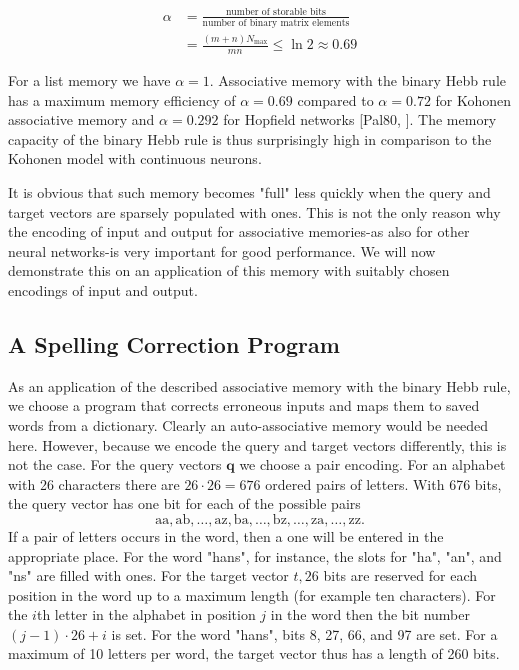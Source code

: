 \documentclass[10pt]{book}
\begin{document}
\begin{align*}
\alpha & = \frac{\text{number of storable bits}}{\text{number of binary matrix elements}} \tag{9.11}\\
& = \frac{(m+n) N_{\max}}{m n} \leq \ln 2 \approx 0.69
\end{align*}

For a list memory we have $\alpha=1$. Associative memory with the binary Hebb rule has a maximum memory efficiency of $\alpha=0.69$ compared to $\alpha=0.72$ for Kohonen associative memory and $\alpha=0.292$ for Hopfield networks [Pal80, \cite{palm1991memory}]. The memory capacity of the binary Hebb rule is thus surprisingly high in comparison to the Kohonen model with continuous neurons.

It is obvious that such memory becomes "full" less quickly when the query and target vectors are sparsely populated with ones. This is not the only reason why the encoding of input and output for associative memories-as also for other neural networks-is very important for good performance. We will now demonstrate this on an application of this memory with suitably chosen encodings of input and output.

\subsection{A Spelling Correction Program}
As an application of the described associative memory with the binary Hebb rule, we choose a program that corrects erroneous inputs and maps them to saved words from a dictionary. Clearly an auto-associative memory would be needed here. However, because we encode the query and target vectors differently, this is not the case. For the query vectors $\boldsymbol{q}$ we choose a pair encoding. For an alphabet with 26 characters there are $26 \cdot 26=676$ ordered pairs of letters. With 676 bits, the query vector has one bit for each of the possible pairs
$$
\mathrm{aa}, \mathrm{ab}, \ldots, \mathrm{az}, \mathrm{ba}, \ldots, \mathrm{bz}, \ldots, \mathrm{za}, \ldots, \mathrm{zz} .
$$
If a pair of letters occurs in the word, then a one will be entered in the appropriate place. For the word "hans", for instance, the slots for "ha", "an", and "ns" are filled with ones. For the target vector $t, 26$ bits are reserved for each position in the word up to a maximum length (for example ten characters). For the $i$th letter in the alphabet in position $j$ in the word then the bit number $(j-1) \cdot 26+i$ is set. For the word "hans", bits 8, 27, 66, and 97 are set. For a maximum of 10 letters per word, the target vector thus has a length of 260 bits.
\end{document}
